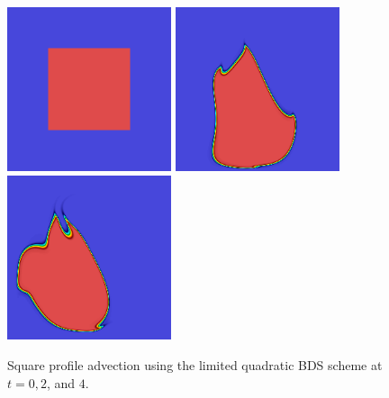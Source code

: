 \documentclass[final]{siamltex}
\begin{document}
\begin{figure}[h]
\begin{center}
\includegraphics[width=1.9in]{square_movie1}
\includegraphics[width=1.9in]{square_movie2}
\includegraphics[width=1.9in]{square_movie3}
\caption{Square profile advection using the limited quadratic BDS scheme at $t=0,2$, and $4$.}
\label{fig:square2}
\end{center}
\end{figure}
\end{document}
